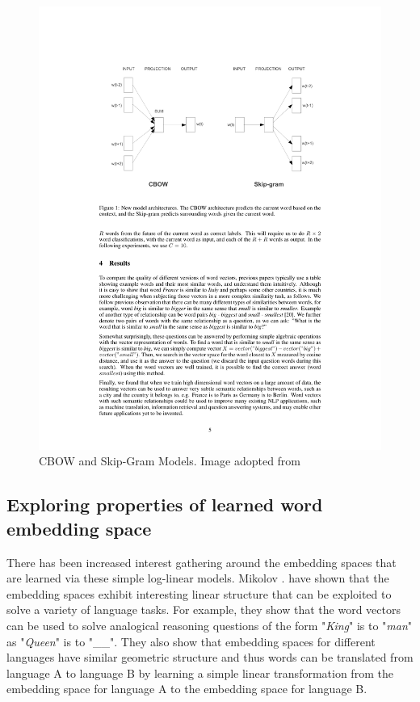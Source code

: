 \begin{figure}[h]
\centering
\includegraphics[width=\textwidth]{./images/model_images.pdf}
\caption{CBOW and Skip-Gram Models. Image adopted from \cite{mikolov1}}
\label{fig:top_k}
\end{figure}

\clearpage 


\subsection{Exploring properties of learned word embedding space}

There has been increased interest gathering around the embedding spaces that are learned via these simple log-linear models. Mikolov \etal. \cite{mikolov3} \cite{mikolov4} have shown that the embedding spaces exhibit interesting linear structure that can be exploited to solve a variety of language tasks. For example, they show that the word vectors can be used to solve analogical reasoning questions of the form "{\it King}" is to "{\it man}" as "{\it Queen}" is to "\_\_". They also show that embedding spaces for different languages have similar geometric structure and thus words can be translated from language A to language B by learning a simple linear transformation from the embedding space for language A to the embedding space for language B. 

